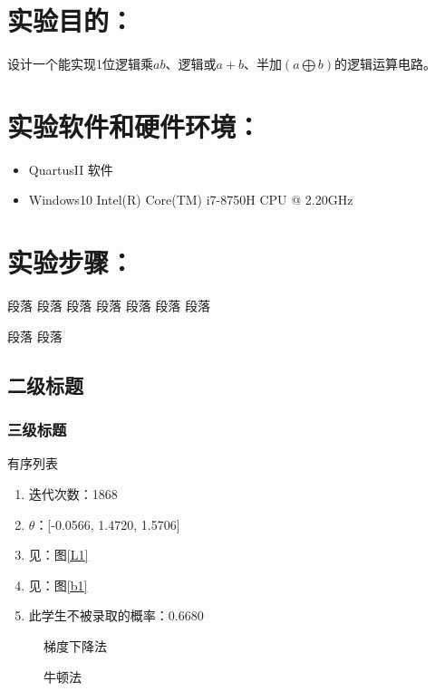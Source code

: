\documentclass{sdureport}
\begin{document}
\begin{sduDocument}	
	\section{实验目的：}	
	设计一个能实现1位逻辑乘$ab$、逻辑或$a+b$、半加$(a\bigoplus b)$的逻辑运算电路。

	\section{实验软件和硬件环境：}
	\begin{itemize}[leftmargin=1em] 
		\item QuartusII 软件
	    \item Windows10 Intel(R) Core(TM) i7-8750H CPU @ 2.20GHz
	\end{itemize}
	

	\section{实验步骤：}
	段落	段落	段落	段落	段落	段落
	段落	
	
	

	段落	段落
	\subsection{二级标题}
	\subsubsection{三级标题}
	
	有序列表		
	\begin{enumerate}
		\item 迭代次数：1868
		\item $\theta$：[-0.0566, 1.4720, 1.5706]
		\item 见：图\ref{L1}
		\item 见：图\ref{b1}
		\item 此学生不被录取的概率：0.6680
	\end{enumerate}

	\begin{figure}[H]
		\caption{梯度下降法}
	\end{figure}
	\begin{figure}[H]
	\caption{牛顿法}
	\end{figure}

\end{sduDocument}
\end{document}
